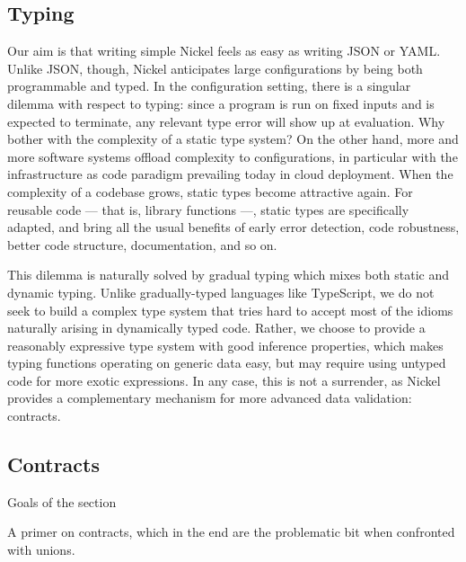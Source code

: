 \subsection{Typing}

Our aim is that writing simple Nickel feels as easy as writing JSON or YAML.
Unlike JSON, though, Nickel anticipates large configurations by being both
programmable and typed. In the configuration setting, there is a singular
dilemma with respect to typing: since a program is run on fixed inputs and is
expected to terminate, any relevant type error will show up at evaluation.  Why
bother with the complexity of a static type system? On the other hand, more and
more software systems offload complexity to configurations, in particular with
the infrastructure as code paradigm prevailing today in cloud deployment. When
the complexity of a codebase grows, static types become attractive again.  For
reusable code — that is, library functions —, static types are specifically
adapted, and bring all the usual benefits of early error detection, code
robustness, better code structure, documentation, and so on.

This dilemma is naturally solved by gradual typing\cite{Siek06gradualtyping}
which mixes both static and dynamic typing. Unlike gradually-typed languages
like TypeScript, we do not seek to build a complex type system that tries hard
to accept most of the idioms naturally arising in dynamically typed code.
Rather, we choose to provide a reasonably expressive type system with good
inference properties, which makes typing functions operating on generic data easy,
but may require using untyped code for more exotic expressions.  In any case,
this is not a surrender, as Nickel provides a complementary mechanism for more
advanced data validation: contracts.

\subsection{Contracts}
{\color{red}Goals of the section

A primer on contracts, which in the end are the problematic bit when confronted
with unions.\vspace{0.5cm}}

